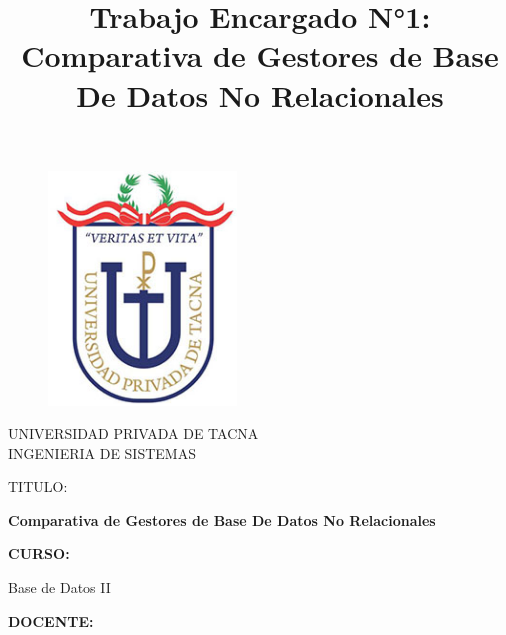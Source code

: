 \documentclass[twoside,twocolumn]{article}
\begin{document}
\title{Trabajo Encargado N°1: Comparativa de Gestores de Base De Datos No Relacionales}

\begin{titlepage}
\begin{figure}[htb]
\begin{center}
\includegraphics[width=5cm]{imagenes/logo.png}
\end{center}
\end{figure}
\vspace*{-0.25in}
\begin{center}
\large{UNIVERSIDAD PRIVADA DE TACNA}\\
\vspace*{-0.025in}
INGENIERIA DE SISTEMAS  \\

\vspace*{0.5in}
\begin{large}
TITULO:\\
\end{large}

\vspace*{0.1in}
\begin{Large}
\textbf{Comparativa de Gestores de Base De Datos No Relacionales} \\
\end{Large}

\vspace*{0.3in}
\begin{Large}
\textbf{CURSO:} \\
\end{Large}

\vspace*{0.1in}
\begin{large}
Base de Datos II\\
\end{large}

\vspace*{0.3in}
\begin{Large}
\textbf{DOCENTE:} \\
\end{Large}


\end{center}
\end{titlepage}
\end{document}
